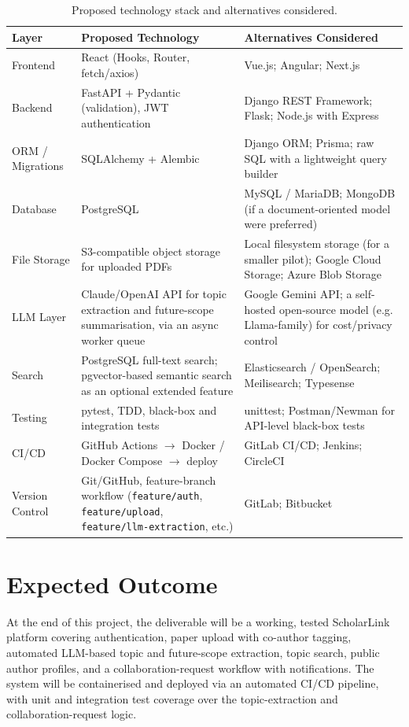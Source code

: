 \documentclass[11pt]{article}
\begin{document}
\begin{table}[h]
\centering
\small
\begin{tabular}{@{}>{\raggedright\arraybackslash}p{2.4cm}>{\raggedright\arraybackslash}p{5.3cm}>{\raggedright\arraybackslash}p{5.3cm}@{}}
\toprule
\textbf{Layer} & \textbf{Proposed Technology} & \textbf{Alternatives Considered} \\
\midrule
Frontend & React (Hooks, Router, fetch/axios) & Vue.js; Angular; Next.js \\
Backend & FastAPI + Pydantic (validation), JWT authentication & Django REST Framework; Flask; Node.js with Express \\
ORM / Migrations & SQLAlchemy + Alembic & Django ORM; Prisma; raw SQL with a lightweight query builder \\
Database & PostgreSQL & MySQL / MariaDB; MongoDB (if a document-oriented model were preferred) \\
File Storage & S3-compatible object storage for uploaded PDFs & Local filesystem storage (for a smaller pilot); Google Cloud Storage; Azure Blob Storage \\
LLM Layer & Claude/OpenAI API for topic extraction and future-scope summarisation, via an async worker queue & Google Gemini API; a self-hosted open-source model (e.g. Llama-family) for cost/privacy control \\
Search & PostgreSQL full-text search; pgvector-based semantic search as an optional extended feature & Elasticsearch / OpenSearch; Meilisearch; Typesense \\
Testing & pytest, TDD, black-box and integration tests & unittest; Postman/Newman for API-level black-box tests \\
CI/CD & GitHub Actions $\rightarrow$ Docker / Docker Compose $\rightarrow$ deploy & GitLab CI/CD; Jenkins; CircleCI \\
Version Control & Git/GitHub, feature-branch workflow (\texttt{feature/auth}, \texttt{feature/upload}, \texttt{feature/llm-extraction}, etc.) & GitLab; Bitbucket \\
\bottomrule
\end{tabular}
\caption{Proposed technology stack and alternatives considered.}
\label{tab:techstack}
\end{table}

\section{Expected Outcome}
At the end of this project, the deliverable will be a working, tested ScholarLink platform covering authentication, paper upload with co-author tagging, automated LLM-based topic and future-scope extraction, topic search, public author profiles, and a collaboration-request workflow with notifications. The system will be containerised and deployed via an automated CI/CD pipeline, with unit and integration test coverage over the topic-extraction and collaboration-request logic.
\end{document}
